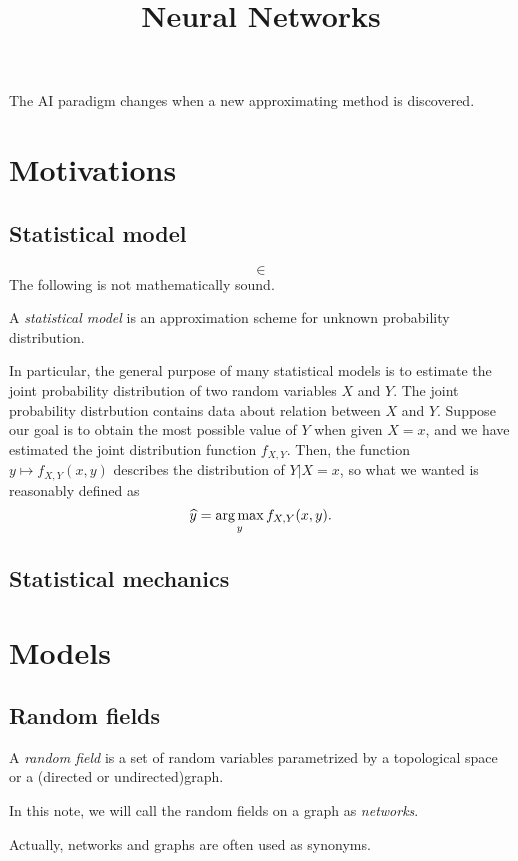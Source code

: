 \documentclass{../exp}
\title{Neural Networks}
\begin{document}
\maketitle
\tableofcontents

The AI paradigm changes when a new approximating method is discovered.

\section{Motivations}


\subsection{Statistical model}
\[\in\]
The following is not mathematically sound.
\begin{defn}
A \emph{statistical model} is an approximation scheme for unknown probability distribution.
\end{defn}
In particular, the general purpose of many statistical models is to estimate the joint probability distribution of two random variables $X$ and $Y$.
The joint probability distrbution contains data about relation between $X$ and $Y$.
Suppose our goal is to obtain the most possible value of $Y$ when given $X=x$, and we have estimated the joint distribution function $f_{X,Y}$.
Then, the function $y\mapsto f_{X,Y}(x,y)$ describes the distribution of $Y|X=x$, so what we wanted is reasonably defined as
\[\widehat y=\operatorname*{arg\,max}_yf_{X,Y}(x,y).\]

\subsection{Statistical mechanics}

\section{Models}

\subsection{Random fields}
\begin{defn}
A \emph{random field} is a set of random variables parametrized by a topological space or a (directed or undirected)graph.
\end{defn}
\begin{defn}
In this note, we will call the random fields on a graph as \emph{networks}.
\end{defn}
Actually, networks and graphs are often used as synonyms.
\end{document}
